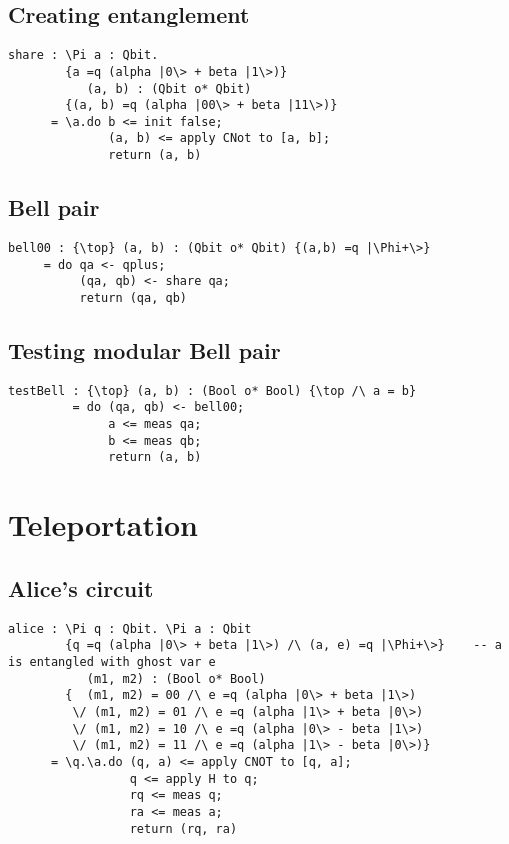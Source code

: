 \documentclass[acmsmall,nonacm,timestamp,review=false,anonymous=false]{acmart}
\begin{document}
\subsection{Creating entanglement}
\begin{lstlisting}[language=QHaskell]
share : \Pi a : Qbit.
        {a =q (alpha |0\> + beta |1\>)}
           (a, b) : (Qbit o* Qbit)
        {(a, b) =q (alpha |00\> + beta |11\>)}
      = \a.do b <= init false;
              (a, b) <= apply CNot to [a, b];
              return (a, b)
\end{lstlisting}

\subsection{Bell pair}
\begin{lstlisting}[language=QHaskell]
bell00 : {\top} (a, b) : (Qbit o* Qbit) {(a,b) =q |\Phi+\>}
     = do qa <- qplus;
          (qa, qb) <- share qa;
          return (qa, qb)
\end{lstlisting}

\subsection{Testing modular Bell pair}
\begin{lstlisting}[language=QHaskell]
testBell : {\top} (a, b) : (Bool o* Bool) {\top /\ a = b}
         = do (qa, qb) <- bell00;
              a <= meas qa;
              b <= meas qb;
              return (a, b)
\end{lstlisting}

\section{Teleportation}
\label{app:teleport}
\subsection{Alice's circuit}
\begin{lstlisting}[language=QHaskell]
alice : \Pi q : Qbit. \Pi a : Qbit
        {q =q (alpha |0\> + beta |1\>) /\ (a, e) =q |\Phi+\>}    -- a is entangled with ghost var e
           (m1, m2) : (Bool o* Bool)
        {  (m1, m2) = 00 /\ e =q (alpha |0\> + beta |1\>)
         \/ (m1, m2) = 01 /\ e =q (alpha |1\> + beta |0\>)
         \/ (m1, m2) = 10 /\ e =q (alpha |0\> - beta |1\>)
         \/ (m1, m2) = 11 /\ e =q (alpha |1\> - beta |0\>)}
      = \q.\a.do (q, a) <= apply CNOT to [q, a];
                 q <= apply H to q;
                 rq <= meas q;
                 ra <= meas a;
                 return (rq, ra)
\end{lstlisting}
\end{document}
